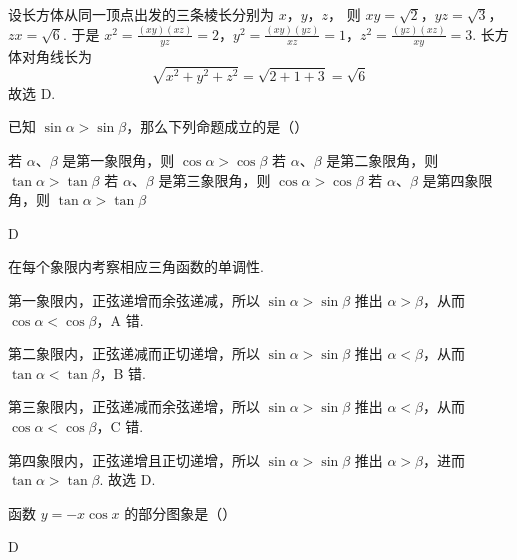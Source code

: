 \begin{solution}
设长方体从同一顶点出发的三条棱长分别为 \(x\)，\(y\)，\(z\)，
则 \(xy=\sqrt{2}\)，\(yz=\sqrt{3}\)，\(zx=\sqrt{6}\).
于是 \(x^{2}=\frac{(xy)(xz)}{yz}=2\)，\(y^{2}=\frac{(xy)(yz)}{xz}=1\)，\(z^{2}=\frac{(yz)(xz)}{xy}=3\).
长方体对角线长为
\[
\sqrt{x^{2}+y^{2}+z^{2}}=\sqrt{2+1+3}=\sqrt{6}
\]
故选 D.
\end{solution}

\begin{problem}
已知 \(\sin \alpha > \sin \beta\)，那么下列命题成立的是（\quad）

\choices
    {若 \(\alpha\)、\(\beta\) 是第一象限角，则 \(\cos \alpha > \cos \beta\)}
    {若 \(\alpha\)、\(\beta\) 是第二象限角，则 \(\tan \alpha > \tan \beta\)}
    {若 \(\alpha\)、\(\beta\) 是第三象限角，则 \(\cos \alpha > \cos \beta\)}
    {若 \(\alpha\)、\(\beta\) 是第四象限角，则 \(\tan \alpha > \tan \beta\)}
\end{problem}

\begin{answer}
D
\end{answer}

\begin{solution}
在每个象限内考察相应三角函数的单调性.

第一象限内，正弦递增而余弦递减，所以 \(\sin\alpha>\sin\beta\) 推出 \(\alpha>\beta\)，从而 \(\cos\alpha<\cos\beta\)，A 错.

第二象限内，正弦递减而正切递增，所以 \(\sin\alpha>\sin\beta\) 推出 \(\alpha<\beta\)，从而 \(\tan\alpha<\tan\beta\)，B 错.

第三象限内，正弦递减而余弦递增，所以 \(\sin\alpha>\sin\beta\) 推出 \(\alpha<\beta\)，从而 \(\cos\alpha<\cos\beta\)，C 错.

第四象限内，正弦递增且正切递增，所以 \(\sin\alpha>\sin\beta\) 推出 \(\alpha>\beta\)，进而 \(\tan\alpha>\tan\beta\). 故选 D.
\end{solution}

\begin{problem}
函数 \( y = -x \cos x \) 的部分图象是（\quad）

    {}
    {}
    {}
\end{problem}

\begin{answer}
D
\end{answer}

